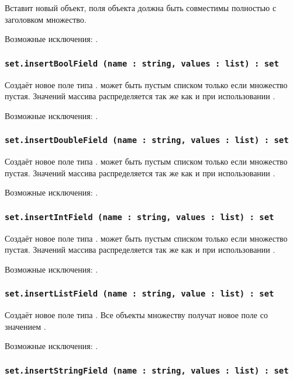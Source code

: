 Вставит новый объект, поля объекта  должна быть совместимы полностью с заголовком множество.

Возможные исключения: .

\subsubsection{\lstinline|set.insertBoolField (name : string, values : list) : set|}

Создаёт новое поле типа \bool.  может быть пустым списком только если множество пустая. Значений массива распределяется так же как и при использовании .

Возможные исключения: .

\subsubsection{\lstinline|set.insertDoubleField (name : string, values : list) : set|}

Создаёт новое поле типа \double.  может быть пустым списком только если множество пустая. Значений массива распределяется так же как и при использовании .

Возможные исключения: .

\subsubsection{\lstinline|set.insertIntField (name : string, values : list) : set|}

Создаёт новое поле типа \integer.  может быть пустым списком только если множество пустая. Значений массива распределяется так же как и при использовании .

Возможные исключения: .

\subsubsection{\lstinline|set.insertListField (name : string, value : list) : set|}

Создаёт новое поле типа \bool. Все объекты множеству получат новое поле со значением .

Возможные исключения: .

\subsubsection{\lstinline|set.insertStringField (name : string, values : list) : set|}

